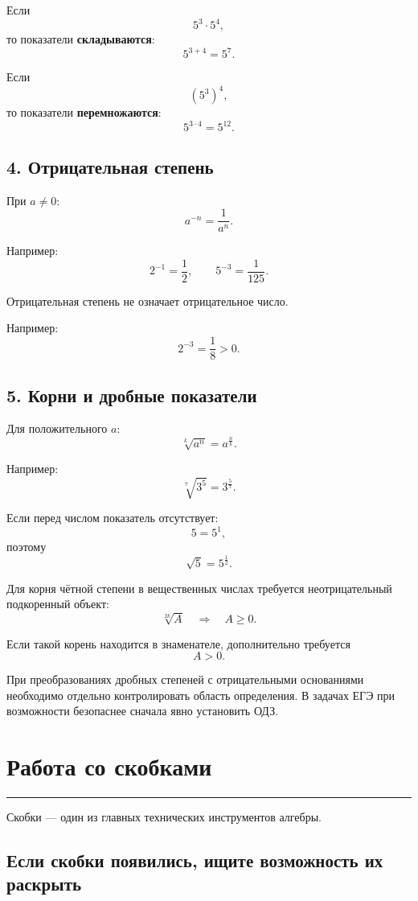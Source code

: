 \documentclass[a4paper,12pt]{article}
\newcommand{\lessonrule}{%
  \par\vspace{0.3em}
  {\color{accent}\rule{\linewidth}{0.6pt}}
  \vspace{0.5em}
}
\newcommand{\important}[1]{\textbf{\color{darkaccent}#1}}
\begin{document}
Если
\[
5^3\cdot5^4,
\]
то показатели \important{складываются}:
\[
5^{3+4}=5^7.
\]

Если
\[
(5^3)^4,
\]
то показатели \important{перемножаются}:
\[
5^{3\cdot4}=5^{12}.
\]

\subsection*{\color{accent}4. Отрицательная степень}

При \(a\ne0\):
\[
a^{-n}=\frac1{a^n}.
\]

Например:
\[
2^{-1}=\frac12,
\qquad
5^{-3}=\frac1{125}.
\]

Отрицательная степень не означает отрицательное число.

Например:
\[
2^{-3}=\frac18>0.
\]

\subsection*{\color{accent}5. Корни и дробные показатели}

Для положительного \(a\):
\[
\sqrt[k]{a^n}=a^{\frac nk}.
\]

Например:
\[
\sqrt[7]{3^5}=3^{\frac57}.
\]

Если перед числом показатель отсутствует:
\[
5=5^1,
\]
поэтому
\[
\sqrt{5}=5^{\frac12}.
\]

Для корня чётной степени в вещественных числах требуется
неотрицательный подкоренный объект:
\[
\sqrt[2k]{A}
\quad\Longrightarrow\quad
A\ge0.
\]

Если такой корень находится в знаменателе, дополнительно требуется
\[
A>0.
\]

При преобразованиях дробных степеней с отрицательными основаниями
необходимо отдельно контролировать область определения.
В задачах ЕГЭ при возможности безопаснее сначала явно установить ОДЗ.

\section*{\color{darkaccent}Работа со скобками}
\lessonrule

Скобки --- один из главных технических инструментов алгебры.

\subsection*{\color{accent}Если скобки появились, ищите возможность их раскрыть}
\end{document}
